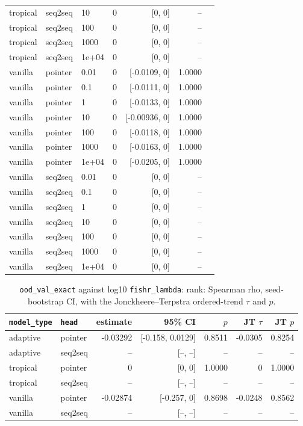 \documentclass[10pt]{article}
\begin{document}
{\begin{longtable}{lllrrrl}
tropical & seq2seq & 10 & 0 & [0, 0] & -- & \\
tropical & seq2seq & 100 & 0 & [0, 0] & -- & \\
tropical & seq2seq & 1000 & 0 & [0, 0] & -- & \\
tropical & seq2seq & 1e+04 & 0 & [0, 0] & -- & \\
vanilla & pointer & 0.01 & 0 & [-0.0109, 0] & 1.0000 & \\
vanilla & pointer & 0.1 & 0 & [-0.0111, 0] & 1.0000 & \\
vanilla & pointer & 1 & 0 & [-0.0133, 0] & 1.0000 & \\
vanilla & pointer & 10 & 0 & [-0.00936, 0] & 1.0000 & \\
vanilla & pointer & 100 & 0 & [-0.0118, 0] & 1.0000 & \\
vanilla & pointer & 1000 & 0 & [-0.0163, 0] & 1.0000 & \\
vanilla & pointer & 1e+04 & 0 & [-0.0205, 0] & 1.0000 & \\
vanilla & seq2seq & 0.01 & 0 & [0, 0] & -- & \\
vanilla & seq2seq & 0.1 & 0 & [0, 0] & -- & \\
vanilla & seq2seq & 1 & 0 & [0, 0] & -- & \\
vanilla & seq2seq & 10 & 0 & [0, 0] & -- & \\
vanilla & seq2seq & 100 & 0 & [0, 0] & -- & \\
vanilla & seq2seq & 1000 & 0 & [0, 0] & -- & \\
vanilla & seq2seq & 1e+04 & 0 & [0, 0] & -- & \\
\bottomrule
\end{longtable}
}

{\small
\begin{longtable}{llrrrrr}
\caption{\texttt{ood\_val\_exact} against log10 \texttt{fishr\_lambda}: rank: Spearman rho, seed-bootstrap CI, with the Jonckheere--Terpstra ordered-trend $\tau$ and $p$.}\label{tab:trend-ood_val_exact}\\
\toprule
\texttt{model\_type} & \texttt{head} & estimate & 95\% CI & $p$ & JT $\tau$ & JT $p$\\
\midrule
\endhead
adaptive & pointer & -0.03292 & [-0.158, 0.0129] & 0.8511 & -0.0305 & 0.8254\\
adaptive & seq2seq & -- & [--, --] & -- & -- & --\\
tropical & pointer & 0 & [0, 0] & 1.0000 & 0 & 1.0000\\
tropical & seq2seq & -- & [--, --] & -- & -- & --\\
vanilla & pointer & -0.02874 & [-0.257, 0] & 0.8698 & -0.0248 & 0.8562\\
vanilla & seq2seq & -- & [--, --] & -- & -- & --\\
\bottomrule
\end{longtable}
}
\end{document}

